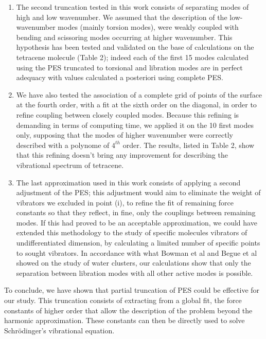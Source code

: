 \begin{enumerate}
	\item The second truncation tested in this work consists of separating modes of high and low wavenumber. We assumed that the description of the low-wavenumber modes (mainly torsion modes), were weakly coupled with bending and scissoring modes occurring at higher wavenumber.  This hypothesis has been tested and validated on the base of calculations on the tetracene molecule (Table 2); indeed each of the first 15 modes calculated using the PES truncated to torsional and libration modes are in perfect adequacy with values calculated a posteriori using complete PES. 
	
	\item We have also tested the association of a complete grid of points of the surface at the fourth order, with a fit at the sixth order on the diagonal, in order to refine coupling between closely coupled modes. Because this refining is demanding in terms of computing time, we applied it on the 10 first modes only, supposing that the modes of higher wavenumber were correctly described with a polynome of $4^{th}$ order. The results, listed in Table 2, show that this refining doesn’t bring any improvement for describing the vibrational spectrum of tetracene.
	
	\item The last approximation used in this work consists of applying a second adjustment of the PES; this adjustment would aim to eliminate the weight of vibrators we excluded in point (i), to refine the fit of remaining force constants so that they reflect, in fine, only the couplings between remaining modes. If this had proved to be an acceptable approximation, we could have extended this methodology to the study of specific molecules vibrators of undifferentiated dimension, by calculating a limited number of specific points to sought vibrators. In accordance with what Bowman et al \cite{bowman2008variational} and Begue et al \cite{begue2010calculation}  showed on the study of water clusters, our calculations show that only the separation between libration modes with all other active modes is possible.
	
\end{enumerate}

To conclude, we have shown that partial truncation of PES could be effective for our study. This truncation consists of extracting from a global fit, the force constants of higher order that allow the description of the problem beyond the harmonic approximation. These constants can then be directly used to solve Schr\"{o}dinger's vibrational equation.

